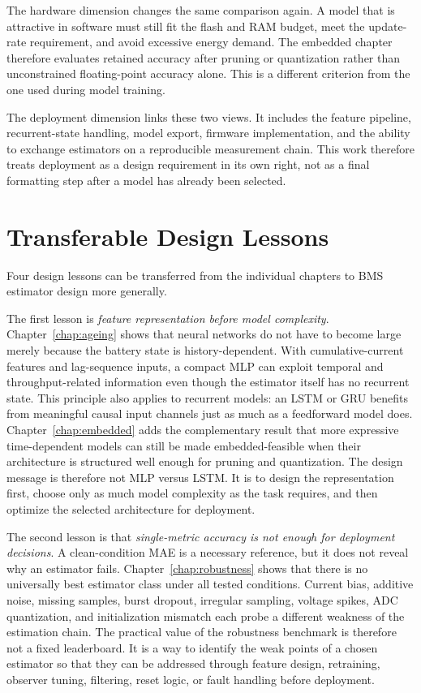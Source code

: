 \documentclass[
    a4paper,
    12pt,
    titlepage,
    bibliography=totoc,
    twoside=on,
    parskip=false,
    numbers=noenddot,
    cleardoublepage=empty,
    DIV=12,
    BCOR=12.0mm,
    headheight=36pt,
    headings=openright
]{scrreprt}
\begin{document}
The hardware dimension changes the same comparison again. A model that is attractive in software must still fit the flash and RAM budget, meet the update-rate requirement, and avoid excessive energy demand. The embedded chapter therefore evaluates retained accuracy after pruning or quantization rather than unconstrained floating-point accuracy alone. This is a different criterion from the one used during model training.

The deployment dimension links these two views. It includes the feature pipeline, recurrent-state handling, model export, firmware implementation, and the ability to exchange estimators on a reproducible measurement chain. This work therefore treats deployment as a design requirement in its own right, not as a final formatting step after a model has already been selected.

\section{Transferable Design Lessons}
Four design lessons can be transferred from the individual chapters to BMS estimator design more generally.

The first lesson is \emph{feature representation before model complexity}. Chapter~\ref{chap:ageing} shows that neural networks do not have to become large merely because the battery state is history-dependent. With cumulative-current features and lag-sequence inputs, a compact MLP can exploit temporal and throughput-related information even though the estimator itself has no recurrent state. This principle also applies to recurrent models: an LSTM or GRU benefits from meaningful causal input channels just as much as a feedforward model does. Chapter~\ref{chap:embedded} adds the complementary result that more expressive time-dependent models can still be made embedded-feasible when their architecture is structured well enough for pruning and quantization. The design message is therefore not MLP versus LSTM. It is to design the representation first, choose only as much model complexity as the task requires, and then optimize the selected architecture for deployment.

The second lesson is that \emph{single-metric accuracy is not enough for deployment decisions}. A clean-condition MAE is a necessary reference, but it does not reveal why an estimator fails. Chapter~\ref{chap:robustness} shows that there is no universally best estimator class under all tested conditions. Current bias, additive noise, missing samples, burst dropout, irregular sampling, voltage spikes, ADC quantization, and initialization mismatch each probe a different weakness of the estimation chain. The practical value of the robustness benchmark is therefore not a fixed leaderboard. It is a way to identify the weak points of a chosen estimator so that they can be addressed through feature design, retraining, observer tuning, filtering, reset logic, or fault handling before deployment.
\end{document}
